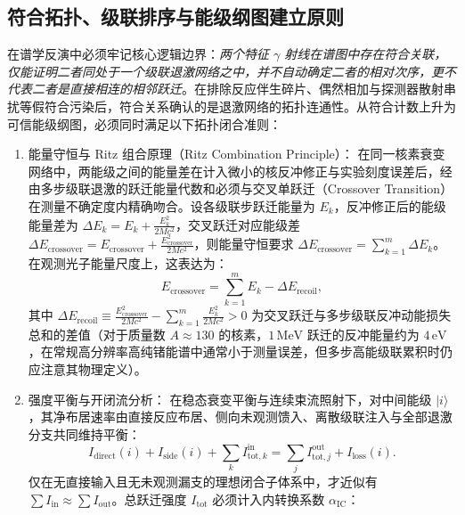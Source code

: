 \subsection{符合拓扑、级联排序与能级纲图建立原则}\label{subsec:5-6-5}

在谱学反演中必须牢记核心逻辑边界：\emph{两个特征 $\gamma$ 射线在谱图中存在符合关联，仅能证明二者同处于一个级联退激网络之中，并不自动确定二者的相对次序，更不代表二者是直接相连的相邻跃迁}。在排除反应伴生碎片、偶然相加与探测器散射串扰等假符合污染后，符合关系确认的是退激网络的拓扑连通性。从符合计数上升为可信能级纲图，必须同时满足以下拓扑闭合准则：
\begin{enumerate}
\item 能量守恒与 Ritz 组合原理（Ritz Combination Principle）：
在同一核素衰变网络中，两能级之间的能量差在计入微小的核反冲修正与实验刻度误差后，经由多步级联退激的跃迁能量代数和必须与交叉单跃迁（Crossover Transition）在测量不确定度内精确吻合。设各级联步跃迁能量为 $E_k$，反冲修正后的能级能量差为 $\Delta E_k = E_k + \frac{E_k^2}{2 M c^2}$，交叉跃迁对应能级差 $\Delta E_{\mathrm{crossover}} = E_{\mathrm{crossover}} + \frac{E_{\mathrm{crossover}}^2}{2 M c^2}$，则能量守恒要求 $\Delta E_{\mathrm{crossover}} = \sum_{k=1}^m \Delta E_k$。在观测光子能量尺度上，这表达为：
\begin{equation}\label{eq:5-6-ritz-combination}
E_{\mathrm{crossover}} = \sum_{k=1}^m E_k - \Delta E_{\mathrm{recoil}},
\end{equation}
其中 $\Delta E_{\mathrm{recoil}} \equiv \frac{E_{\mathrm{crossover}}^2}{2 M c^2} - \sum_{k=1}^m \frac{E_k^2}{2 M c^2} > 0$ 为交叉跃迁与多步级联反冲动能损失总和的差值（对于质量数 $A \approx 130$ 的核素，$1\,\text{MeV}$ 跃迁的反冲能量约为 $4\,\text{eV}$，在常规高分辨率高纯锗能谱中通常小于测量误差，但多步高能级联累积时仍应注意其物理定义）。
\item 强度平衡与开闭流分析：
在稳态衰变平衡与连续束流照射下，对中间能级 $|i\rangle$，其净布居速率由直接反应布居、侧向未观测馈入、离散级联注入与全部退激分支共同维持平衡：
\begin{equation}\label{eq:5-6-intensity-balance}
I_{\mathrm{direct}}(i) + I_{\mathrm{side}}(i) + \sum_{k} I_{\mathrm{tot}, k}^{\mathrm{in}} = \sum_{j} I_{\mathrm{tot}, j}^{\mathrm{out}} + I_{\mathrm{loss}}(i).
\end{equation}
仅在无直接输入且无未观测漏支的理想闭合子体系中，才近似有 $\sum I_{\mathrm{in}} \approx \sum I_{\mathrm{out}}$。总跃迁强度 $I_{\mathrm{tot}}$ 必须计入内转换系数 $\alpha_{\mathrm{IC}}$：
\begin{equation}\label{eq:5-6-itot-expansion}

\end{equation}
\end{enumerate}

